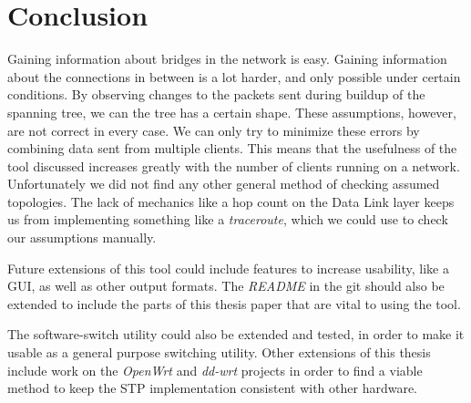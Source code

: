 \chapter*{Conclusion}
Gaining information about bridges in the network is easy.
Gaining information about the connections in between is a lot harder, and only possible under certain conditions.
By observing changes to the packets sent during buildup of the spanning tree, we can the tree has a certain shape.
These assumptions, however, are not correct in every case.
We can only try to minimize these errors by combining data sent from multiple clients.
This means that the usefulness of the tool discussed increases greatly with the number of clients running on a network.
Unfortunately we did not find any other general method of checking assumed topologies.
The lack of mechanics like a hop count on the Data Link layer keeps us from implementing something like a \textit{traceroute}, which we could use to check our assumptions manually.

Future extensions of this tool could include features to increase usability, like a GUI, as well as other output formats.
The \textit{README} in the git should also be extended to include the parts of this thesis paper that are vital to using the tool.
\newline

The software-switch utility could also be extended and tested, in order to make it usable as a general purpose switching utility.
Other extensions of this thesis include work on the \textit{OpenWrt} and \textit{dd-wrt} projects in order to find a viable method to keep the STP implementation consistent with other hardware.
